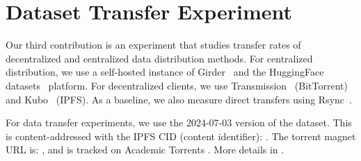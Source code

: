 \section{Dataset Transfer Experiment}
\label{sec:dataset_transfer}

Our third contribution is an experiment that studies transfer rates of decentralized and centralized data
  distribution methods.
For centralized distribution, we use a self-hosted instance of Girder~\cite{girder_2024} and the HuggingFace
  datasets~\cite{huggingface_datasets} platform.
For decentralized clients, we use Transmission~\cite{transmission_2024} (BitTorrent) and
  Kubo~\cite{ipfskubo_2024} (IPFS).
As a baseline, we also measure direct transfers using Rsync~\cite{rsyncprojectrsync_2024}.

For data transfer experiments, we use the 2024-07-03 version of the dataset.
This is content-addressed with the IPFS CID (content identifier):
.
The torrent magnet URL is:
,
and is tracked on Academic Torrents \cite{academic_torrents_Cohen2014}.
More details in .



